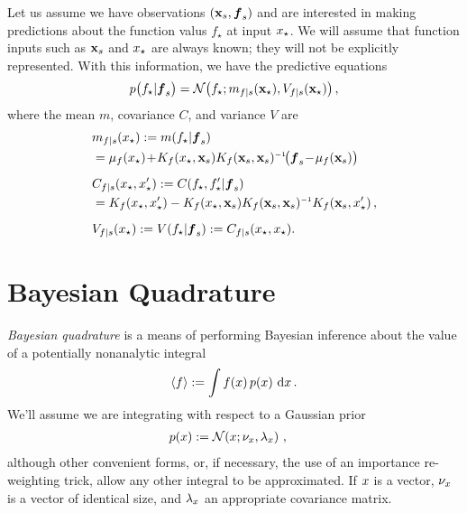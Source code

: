\documentclass{article}
\renewcommand{\pskinny}[2]{p\big(#1|#2\big)}
\begin{document}
Let us assume we have observations $(\vlfv_s,\vf_s)$ and are interested in making predictions about the function valus $f_\star$ at input $\lfv_\star$. We will assume that function inputs such as $\vlfv_s$ and $\lfv_\star$ are always known; they will not be explicitly represented. With this information, we have the predictive equations
$$
\pskinny{f\st}{\vf_s} = 
\bN{f\st}
{\meancond{f}{\vlfv_\star}{s}}
{\covcond{f}{\vlfv_\star}{s}}\,,
$$
where the mean $m$, covariance $C$, and variance $V$ are
\begin{align} 
\textstyle
&\meancond{f}{\lfv_\star}{s}
\deq \mean{f_\star}{\vf_s}
\nonumber\\
&= \mu_{f}(\lfv_\star)\!+\!
K_{f}(\lfv_\star,\vlfv_s)
K_{f}(\vlfv_s,\vlfv_s)\inv\!
\bigl(\vf_s\!-\!{\mu}_{f}(\vlfv_s)\bigr)\label{eq:GPMean}
\\[0.2cm]
&C_{f|s}(\lfv_\star, \lfv'_\star)
\deq C(f_\star,f'_\star|\vf_s) 
\nonumber\\
&= K_{f}(\lfv_\star,\lfv'_\star) - 
K_{f}(\lfv_\star,\vlfv_s)
K_{f}(\vlfv_s,\vlfv_s)\inv
K_{f}(\vlfv_s,\lfv'_\star)\,, \nonumber%
\\[0.2cm]
&\covcond{f}{\lfv_\star}{s}
\deq {\cov{f_\star}{\vf_s}} 
\deq C_{f|s}(\lfv_\star, \lfv_\star).\nonumber
\end{align} 

\section{Bayesian Quadrature} \label{sec:bq}


\emph{Bayesian quadrature} \citep{BZHermiteQuadrature,BZMonteCarlo} is a means of performing Bayesian inference about the value of a potentially nonanalytic integral 
\begin{equation} \label{eq:intyf}
 \inty{f} \deq \int f(\lfv)\,\po{\lfv}\,\ud\lfv\,.
\end{equation}
We'll assume we are integrating with respect to a Gaussian prior
\begin{align}\label{eq:phiprior}
\textstyle
 \po{\lfv} & \deq \N{\lfv}{\nu_{\lfv}}{\lambda_{\lfv}} \,,
\end{align}
although other convenient forms, or, if necessary, the use of an importance re-weighting trick, allow any other integral to be approximated. If $\lfv$ is a vector, $\nu_{\lfv}$ is a  vector of identical size, and $\lambda_{\lfv}$ an appropriate covariance matrix.
\end{document}
